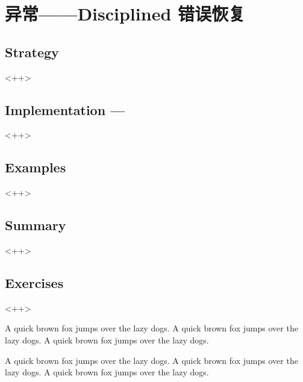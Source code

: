 

\chapter{异常——Disciplined 错误恢复}
\label{ch:Exceptions}

\section{Strategy}<++>

\section{Implementation ---}<++>

\section{Examples}<++>

\section{Summary}<++>

\section{Exercises}<++>

A quick brown fox jumps over the lazy dogs.
A quick brown fox jumps over the lazy dogs.
A quick brown fox jumps over the lazy dogs.

A quick brown fox jumps over the lazy dogs.
A quick brown fox jumps over the lazy dogs.
A quick brown fox jumps over the lazy dogs.


